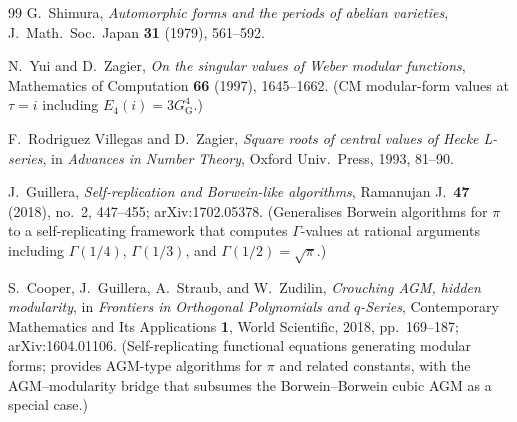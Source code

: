 \documentclass[11pt]{article}
\theoremstyle{definition}
\theoremstyle{remark}
\newcommand{\GG}{G_{\!\scriptscriptstyle\mathrm{G}}}
\begin{document}
\begin{thebibliography}{99}
G.\ Shimura,
\textit{Automorphic forms and the periods of abelian varieties},
J.\ Math.\ Soc.\ Japan \textbf{31} (1979), 561--592.

N.\ Yui and D.\ Zagier,
\textit{On the singular values of Weber modular functions},
Mathematics of Computation \textbf{66} (1997), 1645--1662.
(CM modular-form values at $\tau = i$ including $E_4(i) = 3\GG^4$.)

F.\ Rodriguez Villegas and D.\ Zagier,
\textit{Square roots of central values of Hecke L-series},
in \emph{Advances in Number Theory}, Oxford Univ.\ Press, 1993, 81--90.

J.\ Guillera,
\textit{Self-replication and Borwein-like algorithms},
Ramanujan J.\ \textbf{47} (2018), no.\ 2, 447--455;
arXiv:1702.05378. (Generalises Borwein algorithms for $\pi$ to a
self-replicating framework that computes $\Gamma$-values at rational
arguments including $\Gamma(1/4)$, $\Gamma(1/3)$, and
$\Gamma(1/2) = \sqrt\pi$.)

S.\ Cooper, J.\ Guillera, A.\ Straub, and W.\ Zudilin,
\textit{Crouching AGM, hidden modularity},
in \emph{Frontiers in Orthogonal Polynomials and $q$-Series},
Contemporary Mathematics and Its Applications \textbf{1},
World Scientific, 2018, pp.\ 169--187;
arXiv:1604.01106. (Self-replicating functional equations generating
modular forms; provides AGM-type algorithms for $\pi$ and related
constants, with the AGM--modularity bridge that subsumes the
Borwein--Borwein cubic AGM as a special case.)

\end{thebibliography}
\end{document}
